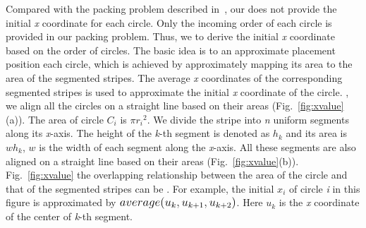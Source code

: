 Compared with the packing problem described in~\cite{ZhaoTVCG2014}, our  does not provide the initial \emph{x} coordinate for each circle.
Only the incoming order of each circle is provided in our packing problem.
Thus, we  to derive the initial \emph{x} coordinate based on the order of  circles.
The basic idea is to  an approximate placement position  each circle, which is achieved by approximately mapping its area to the area of the segmented stripes.
The average  \emph{x} coordinates of the corresponding segmented stripes is  used to approximate the initial \emph{x} coordinate of the circle.
, we align all the circles on a straight line based on their areas (Fig.~\ref{fig:xvalue}(a)).
The area of circle $C_i$ is $\pi{r_i}^2$.
We  divide the stripe into \emph{\normalsize n} uniform segments along its \emph{x}-axis.
The height of the \emph{\normalsize k}-th segment is denoted as $h_k$ and its area is $wh_k$,
 $w$ is the width of each segment along the \emph{x}-axis.
All these segments are also aligned on a straight line based on their areas (Fig.~\ref{fig:xvalue}(b)).
Fig.~\ref{fig:xvalue}  the overlapping relationship between the area of the circle and that of the segmented stripes can be .
For example, the initial $x_i$ of circle \emph{\normalsize i} in this figure is approximated by $\normalsize average(u_k, u_{k+1}, u_{k+2})$.
Here $u_k$ is the \emph{x} coordinate of the center of \emph{\normalsize k}-th segment.

